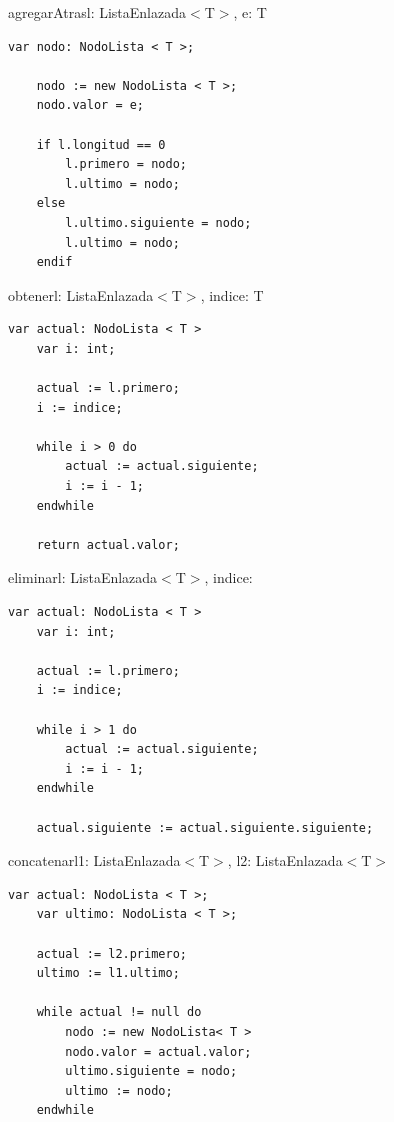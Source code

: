 {
\newcommand{\moduletype}{ListaEnlazada$<$T$>$}
\newcommand{\node}{\text{NodoLista$<$T$>$}}
\begin{proc}{agregarAtras}{\Inout l: \moduletype, \In e: T}{}
	\begin{lstlisting}[numbers=none,frame=none]
	var nodo: NodoLista < T >;
	
	nodo := new NodoLista < T >;
	nodo.valor = e;

	if l.longitud == 0
		l.primero = nodo;
		l.ultimo = nodo;
	else
		l.ultimo.siguiente = nodo;
		l.ultimo = nodo;
	endif
	\end{lstlisting}
\end{proc}

\begin{proc}{obtener}{\In l: \moduletype, \In indice: \Int}{T}
	\begin{lstlisting}[numbers=none,frame=none]
	var actual: NodoLista < T >
	var i: int;

	actual := l.primero;
	i := indice;

	while i > 0 do
		actual := actual.siguiente;
		i := i - 1;
	endwhile

	return actual.valor;
		\end{lstlisting}
\end{proc}

\begin{proc}{eliminar}{\Inout l: \moduletype, \In indice: \Int}{}
	\begin{lstlisting}[numbers=none,frame=none]
	var actual: NodoLista < T >
	var i: int;
	
	actual := l.primero;
	i := indice;

	while i > 1 do
		actual := actual.siguiente;
		i := i - 1;
	endwhile

	actual.siguiente := actual.siguiente.siguiente;
	\end{lstlisting}
\end{proc}

\begin{proc}{concatenar}{\Inout l1: \moduletype, \In l2: \moduletype}{}

	\begin{lstlisting}[numbers=none,frame=none]
	var actual: NodoLista < T >;
	var ultimo: NodoLista < T >;
	
	actual := l2.primero;
	ultimo := l1.ultimo;

	while actual != null do
		nodo := new NodoLista< T >
		nodo.valor = actual.valor;
		ultimo.siguiente = nodo;
		ultimo := nodo;
	endwhile
	\end{lstlisting}
\end{proc}

}
